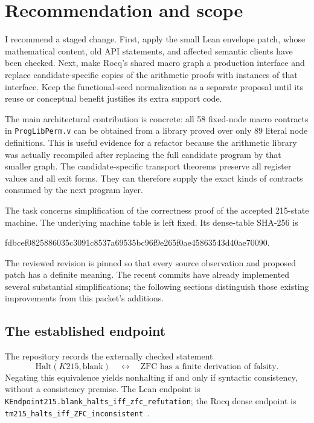 \documentclass[11pt,letterpaper]{article}
\theoremstyle{definition}\newtheorem{definition}[theorem]{Definition}
\theoremstyle{remark}\newtheorem{remark}[theorem]{Remark}
\newcommand{\code}[1]{\texttt{\small #1}}
\begin{document}
\tableofcontents
\newpage

\section{Recommendation and scope}

I recommend a staged change. First, apply the small Lean envelope patch, whose mathematical content, old API statements, and affected semantic clients have been checked. Next, make Rocq's shared macro graph a production interface and replace candidate-specific copies of the arithmetic proofs with instances of that interface. Keep the functional-seed normalization as a separate proposal until its reuse or conceptual benefit justifies its extra support code.

The main architectural contribution is concrete: all 58 fixed-node macro contracts in \code{ProgLibPerm.v} can be obtained from a library proved over only 89 literal node definitions. This is useful evidence for a refactor because the arithmetic library was actually recompiled after replacing the full candidate program by that smaller graph. The candidate-specific transport theorems preserve all register values and all exit forms. They can therefore supply the exact kinds of contracts consumed by the next program layer.

The task concerns simplification of the correctness proof of the accepted 215-state machine. The underlying machine table is left fixed. Its dense-table SHA-256 is
\begin{center}\small\ttfamily
fdbcef0825886035c3091c8537a69535bc96f9e265f0ae45863543d40ae70090.
\end{center}
The reviewed revision is pinned so that every source observation and proposed patch has a definite meaning. The recent commits have already implemented several substantial simplifications; the following sections distinguish those existing improvements from this packet's additions.

\subsection{The established endpoint}

The repository records the externally checked statement
\[
  \mathrm{Halt}(K215,\mathrm{blank})
  \quad\longleftrightarrow\quad
  \text{ZFC has a finite derivation of falsity}.
\]
Negating this equivalence yields nonhalting if and only if syntactic consistency, without a consistency premise. The Lean endpoint is
\code{KEndpoint215.blank\_halts\_iff\_zfc\_refutation}; the Rocq dense endpoint is
\code{tm215\_halts\_iff\_ZFC\_inconsistent}~\cite{verification,endpoint}.
\end{document}

